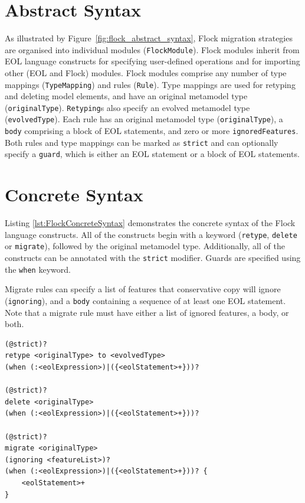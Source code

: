 \section{Abstract Syntax}

As illustrated by Figure~\ref{fig:flock_abstract_syntax}, Flock migration strategies are organised into individual modules (\texttt{Flo\-ckMo\-du\-le}). Flock modules inherit from EOL language constructs for specifying user-defined operations and for importing other (EOL and Flock) modules. Flock modules comprise any number of type mappings (\texttt{Ty\-peMa\-pp\-i\-ng}) and rules (\texttt{Ru\-le}). Type mappings are used for retyping and deleting model elements, and have an original metamodel type (\texttt{or\-ig\-in\-alTy\-pe}). \texttt{Rety\-pi\-ng}s also specify an evolved metamodel type (\texttt{ev\-ol\-vedTy\-pe}). Each rule has an original metamodel type (\texttt{or\-ig\-in\-alTy\-pe}), a \texttt{bo\-dy} comprising a block of EOL statements, and zero or more \texttt{ig\-no\-r\-edFe\-at\-ur\-es}. Both rules and type mappings can be marked as \texttt{str\-ict} and can optionally specify a \texttt{gu\-ard}, which is either an EOL statement or a block of EOL statements.

\section{Concrete Syntax}

Listing \ref{lst:FlockConcreteSyntax} demonstrates the concrete syntax of the Flock language constructs. All of the constructs begin with a keyword (\texttt{retype}, \texttt{delete} or \texttt{migrate}), followed by the original metamodel type. Additionally, all of the constructs can be annotated with the \texttt{strict} modifier. Guards are specified using the \texttt{when} keyword.

Migrate rules can specify a list of features that conservative copy will ignore (\texttt{ignoring}), and a \texttt{body} containing a sequence of at least one EOL statement. Note that a migrate rule must have either a list of ignored features, a body, or both.

\begin{lstlisting}[float=tbp, caption={Concrete syntax of Flock retypings, deletions and migrate rules}, label=lst:FlockConcreteSyntax, language=Flock]
(@strict)?
retype <originalType> to <evolvedType>
(when (:<eolExpression>)|({<eolStatement>+}))?

(@strict)?
delete <originalType>
(when (:<eolExpression>)|({<eolStatement>+}))?

(@strict)?
migrate <originalType>
(ignoring <featureList>)?
(when (:<eolExpression>)|({<eolStatement>+}))? {
	<eolStatement>+
}
\end{lstlisting}



